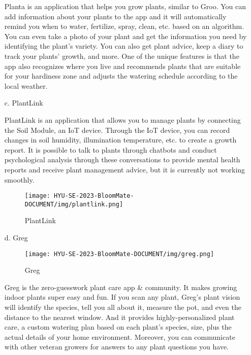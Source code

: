 \documentclass[conference, a4paper]{IEEEtran}
\begin{document}
\begin{enumerate}
\item[]Planta is an application that helps you grow plants, similar to Groo. You can add information about your plants to the app and it will automatically remind you when to water, fertilize, spray, clean, etc. based on an algorithm. You can even take a photo of your plant and get the information you need by identifying the plant's variety. You can also get plant advice, keep a diary to track your plants' growth, and more. One of the unique features is that the app also recognizes where you live and recommends plants that are suitable for your hardiness zone and adjusts the watering schedule according to the local weather.\\
\newpage
\item[c.]PlantLink
\item[]PlantLink is an application that allows you to manage plants by connecting the Soil Module, an IoT device. Through the IoT device, you can record changes in soil humidity, illumination temperature, etc. to create a growth report. It is possible to talk to plants through chatbots and conduct psychological analysis through these conversations to provide mental health reports and receive plant management advice, but it is currently not working smoothly. \\
\begin{figure}[h]
\texttt{[image: HYU-SE-2023-BloomMate-DOCUMENT/img/plantlink.png]}
\label{fig:PlantLinkIoT}
\caption{PlantLink} 
\end{figure}

\item[d.]Greg

\begin{figure}[h]
\texttt{[image: HYU-SE-2023-BloomMate-DOCUMENT/img/greg.png]}
\label{fig:Greg}
\caption{Greg} 
\end{figure}

\item[]Greg is the zero-guesswork plant care app \& community. It makes growing indoor plants super easy and fun. If you scan any plant, Greg’s plant vision will identify the species, tell you all about it, measure the pot, and even the distance to the nearest window. And it provides highly-personalized plant care, a custom watering plan based on each plant’s species, size, plus the actual details of your home environment. Moreover, you can communicate with other veteran growers for answers to any plant questions you have. \\
\end{enumerate}
\end{document}
